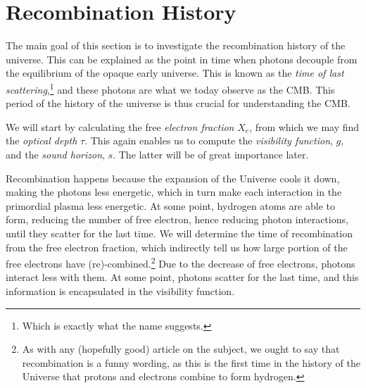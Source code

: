 \section{Recombination History}\label{sec:m2}

The main goal of this section is to investigate the recombination history of the universe. This can be explained as the point in time when photons decouple from the equilibrium of the opaque early universe.  This is known as the \textit{time of last scattering},\footnote{Which is exactly what the name suggests.} and these photons are what we today observe as the CMB. This period of the history of the universe is thus crucial for understanding the CMB. 

We will start by calculating the free \textit{electron fraction} $X_e$, from which we may find the \textit{optical depth} $\tau$. This again enables us to compute the \textit{visibility function}, $g$, and the \textit{sound horizon}, $s$. The latter will be of great importance later. 

Recombination happens because the expansion of the Universe cools it down, making the photons less energetic, which in turn make each interaction in the primordial plasma less energetic. At some point, hydrogen atoms are able to form, reducing the number of free electron, hence reducing photon interactions, until they scatter for the last time. We will determine the time of recombination from the free electron fraction, which indirectly tell us how large portion of the free electrons have (re)-combined.\footnote{As with any (hopefully good) article on the subject, we ought to say that recombination is a funny wording, as this is the first time in the history of the Universe that protons and electrons combine to form hydrogen.} Due to the decrease of free electrons, photons interact less with them. At some point, photons scatter for the last time, and this information is encapsulated in the visibility function. 






